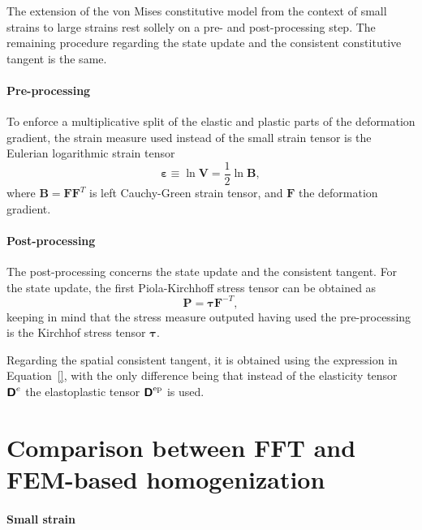 The extension of the von Mises constitutive model from the context of small strains to large strains rest sollely on a pre- and post-processing step.
The remaining procedure regarding the state update and the consistent constitutive tangent is the same.

\paragraph{Pre-processing}

To enforce a multiplicative split of the elastic and plastic parts of the deformation gradient, the strain measure used instead of the small strain tensor is the Eulerian logarithmic strain tensor
\begin{equation}
  \bm \varepsilon \equiv \ln \bm V = \frac{1}{2}\ln \bm B,
\end{equation}
where \(\bm B = \bm F\bm F^T\) is left Cauchy-Green strain tensor, and \(\bm F\) the deformation gradient.

\paragraph{Post-processing}

The post-processing concerns the state update and the consistent tangent.
For the state update, the first Piola-Kirchhoff stress tensor can be obtained as
\begin{equation}
\bm P = \bm \tau \bm F^{-T},
\end{equation}
keeping in mind that the stress measure outputed having used the pre-processing is the Kirchhof stress tensor \(\bm \tau\).

Regarding the spatial consistent tangent, it is obtained using the expression in Equation~\eqref{}, with the only difference being that instead of the elasticity tensor \(\boldsymbol{\mathsf{D}}^e\) the elastoplastic tensor \(\boldsymbol{\mathsf{D}}^\text{ep}\) is used.

\section{Comparison between FFT and FEM-based homogenization}

\paragraph{Small strain}

